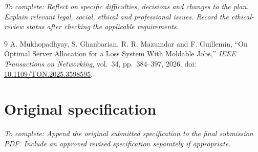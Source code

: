 \documentclass[11pt,a4paper,oneside]{article}
\newcommand{\draftnote}[1]{\par\textit{To complete: #1}\par}
\begin{document}
\draftnote{Reflect on specific difficulties, decisions and changes to the plan.
Explain relevant legal, social, ethical and professional issues. Record the
ethical-review status after checking the applicable requirements.}

\begin{thebibliography}{9}
A. Mukhopadhyay, S. Ghanbarian, R. R. Mazumdar and F. Guillemin,
``On Optimal Server Allocation for a Loss System With Moldable Jobs,''
\emph{IEEE Transactions on Networking}, vol.~34, pp.~384--397, 2026.
doi: \href{https://doi.org/10.1109/TON.2025.3598595}{10.1109/TON.2025.3598595}.
\end{thebibliography}

\appendix
\section{Original specification}

\draftnote{Append the original submitted specification to the final submission
PDF. Include an approved revised specification separately if appropriate.}
\end{document}
